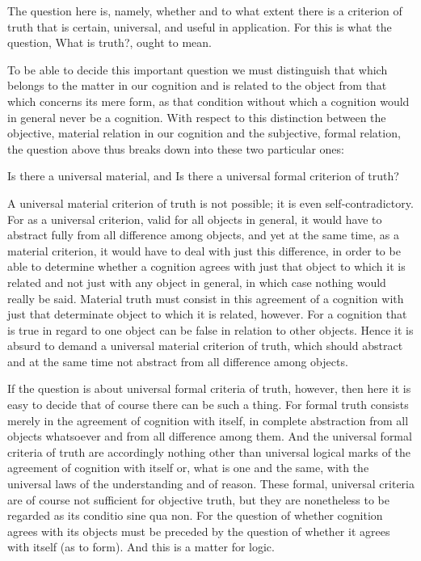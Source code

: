     The question here is, namely, whether and to what extent
    there is a criterion of truth that is
    certain, universal, and useful in application.
    For this is what the question, What is truth?, ought to mean.

    To be able to decide this important question
    we must distinguish that which belongs to
    the matter in our cognition
    and is related to the object
    from that which concerns its mere form,
    as that condition without which a cognition
    would in general never be a cognition.
    With respect to this distinction
    between the objective, material relation in our cognition
    and the subjective, formal relation,
    the question above thus breaks down into
    these two particular ones:

    Is there a universal material, and
    Is there a universal formal criterion of truth?

    A universal material criterion of truth is not possible;
    it is even self-contradictory.
    For as a universal criterion,
    valid for all objects in general,
    it would have to abstract fully
    from all difference among objects,
    and yet at the same time,
    as a material criterion,
    it would have to deal with just this difference,
    in order to be able to determine whether a cognition agrees
    with just that object to which it is related
    and not just with any object in general,
    in which case nothing would really be said.
    Material truth must consist in
    this agreement of a cognition
    with just that determinate object
    to which it is related, however.
    For a cognition that is true in regard to one object
    can be false in relation to other objects.
    Hence it is absurd to demand
    a universal material criterion of truth,
    which should abstract and at the same time not abstract
    from all difference among objects.

    If the question is about
    universal formal criteria of truth, however,
    then here it is easy to decide that
    of course there can be such a thing.
    For formal truth consists merely in
    the agreement of cognition with itself,
    in complete abstraction from all objects whatsoever
    and from all difference among them.
    And the universal formal criteria of truth are
    accordingly nothing other than universal logical marks of
    the agreement of cognition with itself
    or, what is one and the same,
    with the universal laws of the understanding and of reason.
    These formal, universal criteria are of course
    not sufficient for objective truth,
    but they are nonetheless to be regarded
    as its conditio sine qua non.
    For the question of whether
    cognition agrees with its objects
    must be preceded by the question of whether
    it agrees with itself (as to form).
    And this is a matter for logic.

